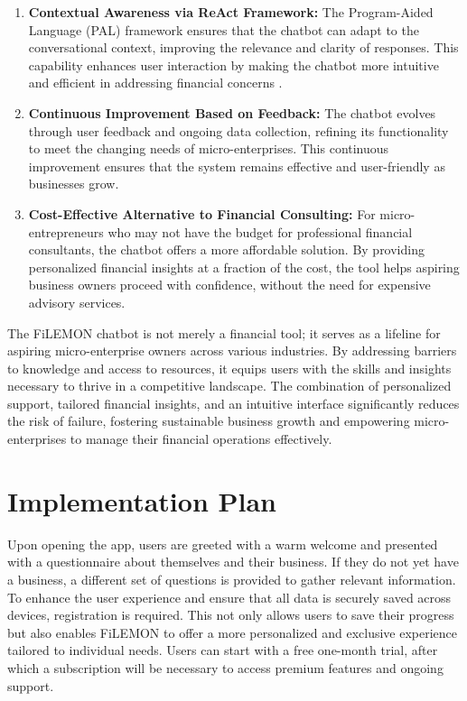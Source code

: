 \documentclass{article}
\begin{document}
\begin{enumerate}[label=(\alph*)]
      \item \textbf{Contextual Awareness via ReAct Framework:} The Program-Aided Language (PAL) framework ensures that the chatbot can adapt to the conversational context, improving the relevance and clarity of responses. This capability enhances user interaction by making the chatbot more intuitive and efficient in addressing financial concerns \parencite{yao_react_2023}.

      \item \textbf{Continuous Improvement Based on Feedback:} The chatbot evolves through user feedback and ongoing data collection, refining its functionality to meet the changing needs of micro-enterprises. This continuous improvement ensures that the system remains effective and user-friendly as businesses grow. 

      
      \item \textbf{Cost-Effective Alternative to Financial Consulting:} For micro-entrepreneurs who may not have the budget for professional financial consultants, the chatbot offers a more affordable solution. By providing personalized financial insights at a fraction of the cost, the tool helps aspiring business owners proceed with confidence, without the need for expensive advisory services.

    \end{enumerate}

    The FiLEMON chatbot is not merely a financial tool; it serves as a lifeline for aspiring micro-enterprise owners across various industries. By addressing barriers to knowledge and access to resources, it equips users with the skills and insights necessary to thrive in a competitive landscape. The combination of personalized support, tailored financial insights, and an intuitive interface significantly reduces the risk of failure, fostering sustainable business growth and empowering micro-enterprises to manage their financial operations effectively.


\section{Implementation Plan}
Upon opening the app, users are greeted with a warm welcome and presented with a questionnaire about themselves and their business. If they do not yet have a business, a different set of questions is provided to gather relevant information. To enhance the user experience and ensure that all data is securely saved across devices, registration is required. This not only allows users to save their progress but also enables FiLEMON to offer a more personalized and exclusive experience tailored to individual needs. Users can start with a free one-month trial, after which a subscription will be necessary to access premium features and ongoing support.
\end{document}
